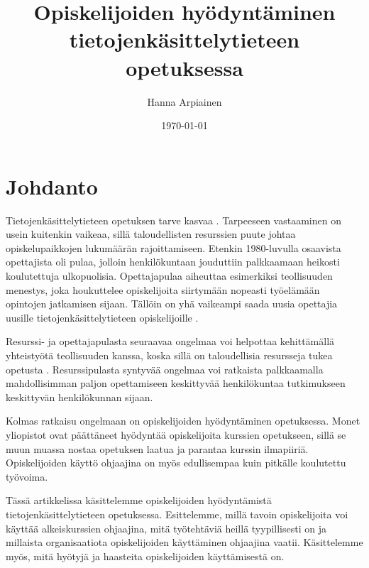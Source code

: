 \documentclass[finnish]{tktltiki2}
\title{﻿Opiskelijoiden hyödyntäminen tietojenkäsittelytieteen \\ opetuksessa}
\author{Hanna Arpiainen}
\date{\today}
\theoremstyle{definition}
\theoremstyle{remark}
\begin{document}
\frontmatter
\maketitle
\makeabstract
\thispagestyle{empty}
\tableofcontents
\thispagestyle{empty}
\newpage

\mainmatter

\setcounter{page}{1}



\section{Johdanto}
Tietojenkäsittelytieteen opetuksen tarve kasvaa \cite{Roberts11}. Tarpeeseen vastaaminen on usein kuitenkin vaikeaa, sillä taloudellisten resurssien puute johtaa opiskelupaikkojen lukumäärän rajoittamiseen. Etenkin 1980-luvulla osaavista opettajista oli pulaa, jolloin henkilökuntaan jouduttiin palkkaamaan heikosti koulutettuja ulkopuolisia. Opettajapulaa aiheuttaa esimerkiksi teollisuuden menestys, joka houkuttelee opiskelijoita siirtymään nopeasti työelämään opintojen jatkamisen sijaan. Tällöin on yhä vaikeampi saada uusia opettajia uusille tietojenkäsittelytieteen opiskelijoille \cite{Roberts99}. \par

Resurssi- ja opettajapulasta seuraavaa ongelmaa voi helpottaa kehittämällä yhteistyötä teollisuuden kanssa, koska sillä on taloudellisia resursseja tukea opetusta \cite{Roberts11}. Resurssipulasta syntyvää ongelmaa voi ratkaista palkkaamalla mahdollisimman paljon opettamiseen keskittyvää henkilökuntaa tutkimukseen keskittyvän henkilökunnan sijaan. \par

Kolmas ratkaisu ongelmaan on opiskelijoiden hyödyntäminen opetuksessa. Monet yliopistot ovat päättäneet hyödyntää opiskelijoita kurssien opetukseen, sillä se muun muassa nostaa opetuksen laatua ja parantaa kurssin ilmapiiriä. Opiskelijoiden käyttö ohjaajina on myös edullisempaa kuin pitkälle koulutettu työvoima. \par

Tässä artikkelissa käsittelemme opiskelijoiden hyödyntämistä tie\-to\-jen\-kä\-sit\-te\-ly\-tie\-teen opetuksessa. Esittelemme, millä tavoin opiskelijoita voi käyttää alkeiskurssien ohjaajina, mitä työtehtäviä heillä tyypillisesti on ja millaista organisaatiota opiskelijoiden käyttäminen ohjaajina vaatii. Käsittelemme myös, mitä hyötyjä ja haasteita opiskelijoiden käyttämisestä on. \par
\end{document}
